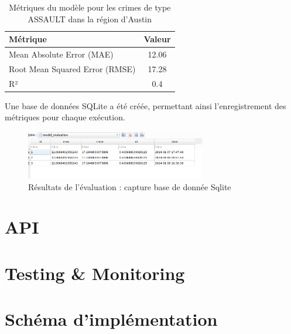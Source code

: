\documentclass[12pt]{article}
\begin{document}
\begin{table}[htbp]
	\centering
	\caption{Métriques du modèle pour les crimes de type ASSAULT dans la région d'Austin}
	\begin{tabular}{|l|c|}
		\hline
		Métrique & Valeur \\
		\hline
		Mean Absolute Error (MAE) & 12.06 \\
		Root Mean Squared Error (RMSE) & 17.28 \\
		R² & 0.4 \\
		\hline
	\end{tabular}
	\label{tab:metrics_assault_austin}
\end{table}
Une base de données SQLite a été créée, permettant ainsi l'enregistrement des métriques pour chaque exécution.
\begin{figure}[htbp]
	\centering
	\includegraphics[width=0.7\textwidth]{Capture_Sqlite.png}
	\caption{Résultats de l'évaluation : capture base de donnée Sqlite}
	\label{fig:assault_austin}
\end{figure}



\section{API}

\section{Testing \& Monitoring}

\section{Schéma d’implémentation}
\end{document}
